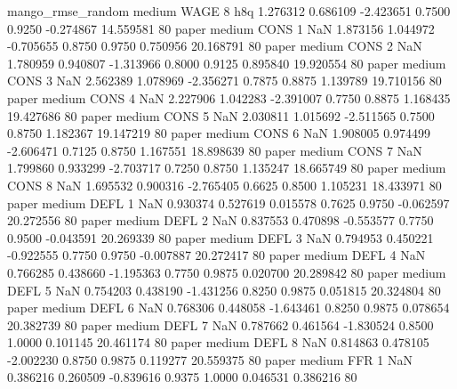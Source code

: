 mango_rmse_random     medium     WAGE                 8                  h8q  1.276312 0.686109 -2.423651 0.7500 0.9250 -0.274867   14.559581 80
            paper     medium     CONS                 1                  NaN  1.873156 1.044972 -0.705655 0.8750 0.9750  0.750956   20.168791 80
            paper     medium     CONS                 2                  NaN  1.780959 0.940807 -1.313966 0.8000 0.9125  0.895840   19.920554 80
            paper     medium     CONS                 3                  NaN  2.562389 1.078969 -2.356271 0.7875 0.8875  1.139789   19.710156 80
            paper     medium     CONS                 4                  NaN  2.227906 1.042283 -2.391007 0.7750 0.8875  1.168435   19.427686 80
            paper     medium     CONS                 5                  NaN  2.030811 1.015692 -2.511565 0.7500 0.8750  1.182367   19.147219 80
            paper     medium     CONS                 6                  NaN  1.908005 0.974499 -2.606471 0.7125 0.8750  1.167551   18.898639 80
            paper     medium     CONS                 7                  NaN  1.799860 0.933299 -2.703717 0.7250 0.8750  1.135247   18.665749 80
            paper     medium     CONS                 8                  NaN  1.695532 0.900316 -2.765405 0.6625 0.8500  1.105231   18.433971 80
            paper     medium     DEFL                 1                  NaN  0.930374 0.527619  0.015578 0.7625 0.9750 -0.062597   20.272556 80
            paper     medium     DEFL                 2                  NaN  0.837553 0.470898 -0.553577 0.7750 0.9500 -0.043591   20.269339 80
            paper     medium     DEFL                 3                  NaN  0.794953 0.450221 -0.922555 0.7750 0.9750 -0.007887   20.272417 80
            paper     medium     DEFL                 4                  NaN  0.766285 0.438660 -1.195363 0.7750 0.9875  0.020700   20.289842 80
            paper     medium     DEFL                 5                  NaN  0.754203 0.438190 -1.431256 0.8250 0.9875  0.051815   20.324804 80
            paper     medium     DEFL                 6                  NaN  0.768306 0.448058 -1.643461 0.8250 0.9875  0.078654   20.382739 80
            paper     medium     DEFL                 7                  NaN  0.787662 0.461564 -1.830524 0.8500 1.0000  0.101145   20.461174 80
            paper     medium     DEFL                 8                  NaN  0.814863 0.478105 -2.002230 0.8750 0.9875  0.119277   20.559375 80
            paper     medium      FFR                 1                  NaN  0.386216 0.260509 -0.839616 0.9375 1.0000  0.046531    0.386216 80
